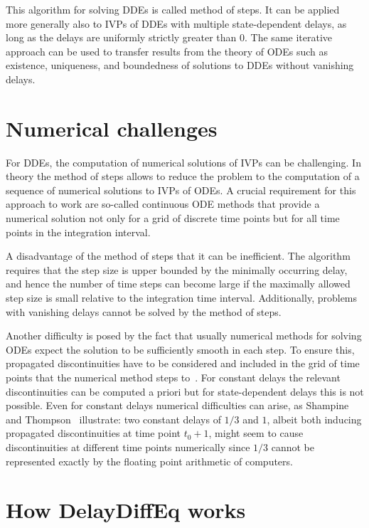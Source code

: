 \documentclass{juliacon}
\begin{document}
This algorithm for solving DDEs is called method of steps. It can be applied more
generally also to IVPs of DDEs with multiple state-dependent delays, as long as the
delays are uniformly strictly greater than 0. The same iterative approach can be
used to transfer results from the theory of ODEs such as existence, uniqueness, and
boundedness of solutions to DDEs without vanishing delays.

\section{Numerical challenges}

For DDEs, the computation of numerical solutions of IVPs can be challenging. In
theory the method of steps allows to reduce the problem to the computation of
a sequence of numerical solutions to IVPs of ODEs. A crucial requirement
for this approach to work are so-called continuous ODE methods that provide a
numerical solution not only for a grid of discrete time points but for all
time points in the integration interval.

A disadvantage of the method of steps that it can be inefficient.
The algorithm requires that the step size is upper bounded by the
minimally occurring delay, and hence the number of time steps can become
large if the maximally allowed step size is small relative to the integration time
interval. Additionally, problems with vanishing delays cannot be solved by the
method of steps.

Another difficulty is posed by the fact that usually numerical methods for
solving ODEs expect the solution to be sufficiently smooth in each step. To
ensure this, propagated discontinuities have to be considered and included
in the grid of time points that the numerical method steps to~\cite{bellen03_numer_methods_delay_differ_equat}.
For constant delays the
relevant discontinuities can be computed a priori but for state-dependent
delays this is not possible. Even for constant delays numerical
difficulties can arise, as Shampine and
Thompson~\cite{shampine01_solving_ddes_matlab} illustrate: two constant delays
of $1/3$ and $1$, albeit both inducing propagated discontinuities at time point
$t_0 + 1$, might seem to cause discontinuities at different time points
numerically since $1/3$ cannot be represented exactly by the floating point
arithmetic of computers.

\section{How DelayDiffEq works}
\end{document}
